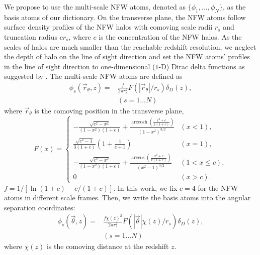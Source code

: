 \documentclass[twocolumn]{aastex63}
\DeclareMathOperator{\arccosh}{arccosh}
\begin{document}
We propose to use the multi-scale NFW atoms, denoted as
$\{\phi_1,...,\phi_N\}$, as the basis atoms of our dictionary.  On the
transverse plane, the NFW atoms follow surface density profiles of the NFW
halos \citep{haloModel-TJ2003-3pt} with comoving scale radii $r_s$ and
truncation radius $c r_s$, where $c$ is the concentration of the NFW halos.  As
the scales of halos are much smaller than the reachable redshift resolution, we
neglect the depth of halo on the line of sight direction and set the NFW atoms'
profiles in the line of sight direction to one-dimensional ($1$-D) Dirac delta
functions as suggested by \citep{LSS-massMap-Glimpse3D-Leonard2014}. The
multi-scale NFW atoms are defined as
\begin{equation}
\begin{split}
\phi_s(\vec{r}_{\theta},z) =&\frac{f}{2 \pi r_s^2 }
F(|\vec{r}_{\theta}|/r_s) \delta_D(z),\\
&  (s=1...N)
\end{split}
\end{equation}
where $\vec{r}_\theta$ is the comoving position in the transverse plane,
\begin{equation}
F(x)=
\begin{cases}
-\frac{\sqrt{c^2-x^2}}{(1-x^2)(1+c)} + \frac{\arccosh
\left(\frac{x^2+c}{x(1+c)}\right)}{(1-x^2)^{3/2}}  & (x<1),\\
\frac{\sqrt{c^2-1}}{3(1+c)} (1+\frac{1}{c+1}) & (x=1),\\
-\frac{\sqrt{c^2-x^2}}{(1-x^2)(1+c)} +
\frac{\arccos\left(\frac{x^2+c}{x(1+c)}\right)}{(x^2-1)^{3/2}} & (1<x\leq c),\\
0& (x>c).
\end{cases}
\end{equation}
$f=1/[\ln (1+c)-c/(1+c)]$. In this work, we fix $c=4$ for the NFW atoms in
different scale frames. Then, we write the basis atoms into the angular
separation coordinates:
\begin{equation}
\begin{split}
\phi_s(\vec{\theta},z) =&\frac{f \chi(z)^2}{2 \pi r_s^2 }
F(|\vec{\theta}|\chi(z)/r_s) \delta_D(z),\\
& (s=1...N)
\end{split}
\end{equation}
where $\chi(z)$ is the comoving distance at the redshift $z$.
\end{document}
